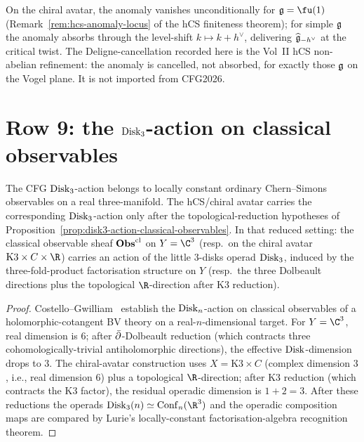 \begin{remark}
\label{rem:cfg-row-8-dichotomy}
On the chiral avatar, the anomaly vanishes unconditionally for
$\fg = \fu(1)$ (Remark~\ref{rem:hcs-anomaly-locus} of
the hCS finiteness theorem); for simple $\mathfrak{g}$ the
anomaly absorbs through the level-shift
$k\mapsto k + h^\vee$, delivering $\widehat{\mathfrak{g}}_{-h^\vee}$ at the
critical twist. The Deligne-cancellation recorded here is the Vol~II
hCS non-abelian refinement: the anomaly is cancelled, not absorbed, for
exactly those $\mathfrak{g}$ on the Vogel plane. It is not imported from
CFG2026.
\end{remark}

\section{\texorpdfstring{Row 9: the $\mathrm{Disk}_3$-action on classical observables}{Row 9: the Disk 3 action on classical observables}}
\label{sec:cfg-row-9-disk3}

\begin{theorem}
\label{thm:cfg-row-9}
The CFG $\mathrm{Disk}_3$-action belongs to locally constant ordinary
Chern--Simons observables on a real three-manifold. The hCS/chiral
avatar carries the corresponding $\mathrm{Disk}_3$-action only after the
topological-reduction hypotheses of
Proposition~\ref{prop:disk3-action-classical-observables}. In that
reduced setting:
the classical observable sheaf $\mathbf{Obs}^{\mathrm{cl}}$ on $Y = \C^3$
(resp.\ on the chiral avatar $\mathrm{K3}\times C\times\R$) carries an
action of the little $3$-disks operad $\mathrm{Disk}_3$, induced by the
three-fold-product factorisation structure on $Y$ (resp.\ the three
Dolbeault directions plus the topological $\R$-direction after K3
reduction).
\end{theorem}

\begin{proof}
Costello--Gwilliam~\cite[Ch.~4, Thm.~4.4.1]{CG17} establish the
$\mathrm{Disk}_{n}$-action on classical observables of a holomorphic-cotangent
BV theory on a real-$n$-dimensional target. For $Y = \C^3$, real
dimension is $6$; after $\bar\partial$-Dolbeault reduction (which contracts
three cohomologically-trivial antiholomorphic directions), the
effective $\mathrm{Disk}$-dimension drops to $3$. The chiral-avatar construction
uses $X = \mathrm{K3}\times C$ (complex dimension $3$, i.e., real
dimension $6$) plus a topological $\R$-direction; after K3 reduction
(which contracts the K3 factor), the residual operadic dimension is
$1 + 2 = 3$. After these reductions the operads
$\Disk_3(n)\simeq \Conf_n(\R^3)$ and the operadic composition maps
are compared by Lurie's locally-constant factorisation-algebra
recognition theorem.
\end{proof}

